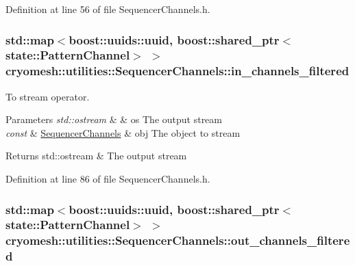 \-Definition at line 56 of file \-Sequencer\-Channels.\-h.

\hypertarget{classcryomesh_1_1utilities_1_1SequencerChannels_a5c846c9a395100a4dae3dfb96e0b584c}{
\subsubsection[{in\-\_\-channels\-\_\-filtered}]{\setlength{\rightskip}{0pt plus 5cm}std\-::map$<$boost\-::uuids\-::uuid, boost\-::shared\-\_\-ptr$<${\bf state\-::\-Pattern\-Channel}$>$ $>$ {\bf cryomesh\-::utilities\-::\-Sequencer\-Channels\-::in\-\_\-channels\-\_\-filtered}}}\label{classcryomesh_1_1utilities_1_1SequencerChannels_a5c846c9a395100a4dae3dfb96e0b584c}


\-To stream operator. 


\begin{DoxyParams}{\-Parameters}
{\em std\-::ostream} & \& os \-The output stream \\
\hline
{\em const} & \hyperlink{classcryomesh_1_1utilities_1_1SequencerChannels}{\-Sequencer\-Channels} \& obj \-The object to stream\\
\hline
\end{DoxyParams}
\begin{DoxyReturn}{\-Returns}
std\-::ostream \& \-The output stream 
\end{DoxyReturn}


\-Definition at line 86 of file \-Sequencer\-Channels.\-h.

\hypertarget{classcryomesh_1_1utilities_1_1SequencerChannels_a351a6f64e6aed5cb76304f98d8a0ebd8}{
\subsubsection[{out\-\_\-channels\-\_\-filtered}]{\setlength{\rightskip}{0pt plus 5cm}std\-::map$<$boost\-::uuids\-::uuid, boost\-::shared\-\_\-ptr$<${\bf state\-::\-Pattern\-Channel}$>$ $>$ {\bf cryomesh\-::utilities\-::\-Sequencer\-Channels\-::out\-\_\-channels\-\_\-filtered}}}\label{classcryomesh_1_1utilities_1_1SequencerChannels_a351a6f64e6aed5cb76304f98d8a0ebd8}


